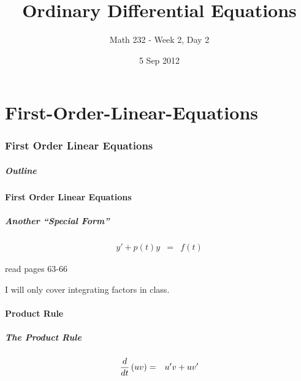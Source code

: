 \part{First-Order-Linear-Equations}
\section{First Order Linear Equations}

\title{Ordinary Differential Equations}
\subtitle{Math 232 - Week 2, Day 2}
\date{5 Sep 2012}

\begin{frame}
  \titlepage
\end{frame}

\begin{frame}
  \frametitle{Outline}
\end{frame}


\subsection{First Order Linear Equations}


\begin{frame}
  \frametitle{Another ``Special Form''}

  \begin{eqnarray*}
    y' + p(t) y & = & f(t)
  \end{eqnarray*}

  read pages 63-66 

  I will only cover integrating factors in class.

\end{frame}

\subsection{Product Rule}

\begin{frame}
  \frametitle{The Product Rule}

  \begin{eqnarray*}
    \frac{d}{dt} \left( u v \right) & = & u' v + u v'
  \end{eqnarray*}

\end{frame}



